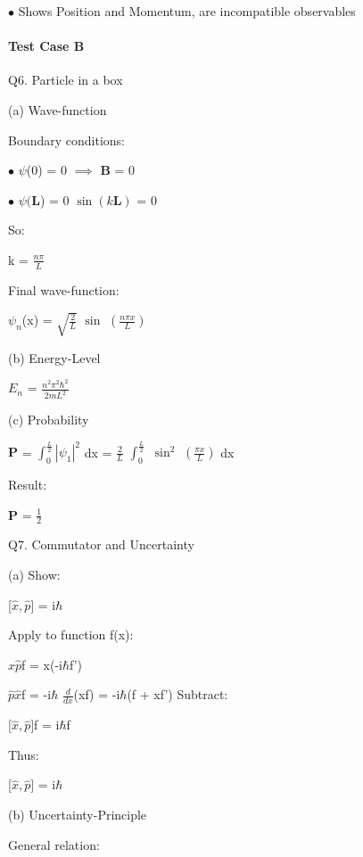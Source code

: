 \documentclass[a4paper, 10pt, onepage]{elegantbook}
\begin{document}
{$\bullet$ Shows Position and Momentum, are incompatible observables 
 
\paragraph{Test Case B}
\noindent

Q6. Particle in a box 

(a) Wave-function  
 
Boundary conditions:  
  
$\bullet$ $\psi$(0) = 0 $\implies$ $\mathbf {B}$ = 0  

$\bullet$ $\psi ( \mathbf{L}$) = 0 $\sin ({k}{\mathbf L})$ = 0  
  
So:  

    k = $\frac{{n} \pi}{L}$  

Final wave-function: 
 
$\psi_n$(x) = $\sqrt{\frac{2}{L}}$ $\sin$ $\left( \frac{{n} \pi {x}}{L} \right)$ 
 
  
(b) Energy-Level 

$E_n$ = $\frac{n^2 \pi^2 \hbar^2}{2{m}{L}^2}$ 
 
(c) Probability 
 
$\mathbf {P}$ = $\int_0^{ \frac{L}{2}}|\psi_1|^2$ dx
              = $\frac{2}{L}$ $\int_0^{\frac{L}{2}}$ $\sin^2$ $\left( \frac{\pi {x}}{L} \right)$ dx  
  
Result:  
  
$\mathbf {P}$ = $\frac{1}{2}$  

Q7. Commutator and Uncertainty  
  
(a) Show: 

    [$\hat {x}, \hat {p}]$ = i$\hbar$  

    Apply to function f(x): 
 
        $\hat {x} \hat {p}$f = x(-i$\hbar$f') 
 
                                 $\hat {p} \hat {x}$f = -i$\hbar$ $\frac{d}{d{x}}$(xf) = -i$\hbar$(f + xf')  
   Subtract:  
  
        [$\hat x, \hat p]$f = i$\hbar$f 
 
   Thus: 
 
        [$\hat x, \hat p]$ = i$\hbar$ 
 
(b) Uncertainty-Principle 
                                                                                                
    General relation: 
 
}
\end{document}
